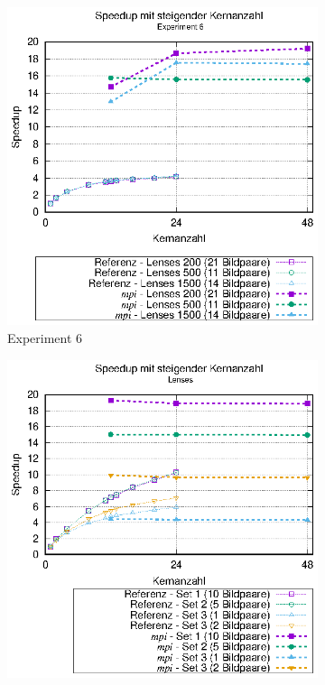 \begin{center}
	\begin{figure}[htbp]
		\begin{subfigure}[b]{0.45\textwidth}
			\centering
			\includegraphics[width=\textwidth]{pdf/mpi_speedup_exp6}
			\caption{Experiment 6}
			\label{fig:mpi_speedup_exp6}
		\end{subfigure}
		\hfill
		\begin{subfigure}[b]{0.45\textwidth}
			\centering
			\includegraphics[width=\textwidth]{pdf/mpi_speedup_lenses}

\end{subfigure}
\end{figure}
\end{center}
